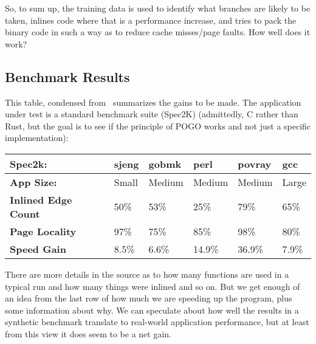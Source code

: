 So, to sum up, the training data is used to identify what branches are likely to be taken, inlines code where that is a performance increase, and tries to pack the binary code in such a way as to reduce cache misses/page faults. How well does it work?

\subsection*{Benchmark Results}

This table, condensed from~\cite{pogo2} summarizes the gains to be made. The application under test is a standard benchmark suite (Spec2K) (admittedly, C rather than Rust, but the goal is to see if the principle of POGO works and not just a specific implementation):

\begin{center}
\begin{tabular}{l|l|l|l|l|l}
	\textbf{Spec2k:} & \textbf{sjeng} & \textbf{gobmk} & \textbf{perl} & \textbf{povray} & \textbf{gcc}\\ \hline
	\textbf{App Size:} &  {Small} & {Medium} & {Medium} & {Medium} & {Large} \\ \hline
	\textbf{Inlined Edge Count} & 50\% & 53\% & 25\% & 79\% & 65\% \\ \hline
	\textbf{Page Locality} & 97\% & 75\% & 85\% & 98\% & 80\% \\ \hline
	\textbf{Speed Gain} & 8.5\% & 6.6\% & 14.9\% & 36.9\% & 7.9\% \\ 
\end{tabular}
\end{center}

There are more details in the source as to how many functions are used in a typical run and how many things were inlined and so on. But we get enough of an idea from the last row of how much we are speeding up the program, plus some information about why. We can speculate about how well the results in a synthetic benchmark translate to real-world application performance, but at least from this view it does seem to be a net gain.






